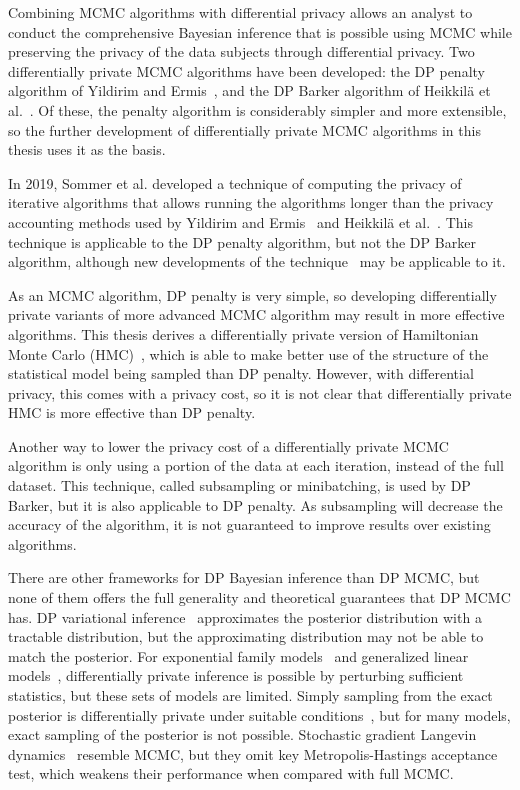 \documentclass[english,twoside,openright]{HYgraduMLDS}
\begin{document}
Combining MCMC algorithms with differential privacy allows
an analyst to conduct the comprehensive Bayesian inference that is
possible using MCMC while preserving the privacy of the data subjects through
differential privacy. Two differentially private MCMC algorithms have been
developed: the DP penalty algorithm of Yildirim and Ermis~\cite{YildirimE19},
and the DP Barker algorithm of Heikkilä et al.~\cite{HeikkilaJDH19}.
Of these, the penalty algorithm is considerably simpler and more extensible,
so the further development of differentially private MCMC algorithms in this
thesis uses it as the basis.

In 2019, Sommer et al. developed a technique of computing the privacy of
iterative algorithms that allows running the algorithms longer than the
privacy accounting methods used by Yildirim and Ermis~\cite{YildirimE19} and
Heikkilä et al.~\cite{HeikkilaJDH19}. This technique is applicable to the
DP penalty algorithm, but not the DP Barker algorithm, although new developments
of the technique~\cite{KJH20} may be applicable to it.

As an MCMC algorithm, DP penalty is very simple, so developing differentially
private variants of more advanced MCMC algorithm may result in more effective
algorithms. This thesis derives a differentially private version of
Hamiltonian Monte Carlo (HMC)~\cite{neal2012mcmc, DKP87}, which is able to make
better use of the structure of the statistical model being sampled than DP penalty.
However, with differential privacy, this comes with a privacy cost, so it is
not clear that differentially private HMC is more effective than DP penalty.

Another way to lower the privacy cost of a differentially private MCMC
algorithm is only using a portion of the data at each iteration, instead of
the full dataset. This technique, called subsampling or minibatching, is used
by DP Barker, but it is also applicable to DP penalty. As subsampling will
decrease the accuracy of the algorithm, it is not guaranteed to improve results
over existing algorithms.

There are other frameworks for DP Bayesian inference than DP MCMC, but none
of them offers the full generality and theoretical guarantees that DP MCMC
has. DP variational inference~\cite{JHD17} approximates the posterior
distribution with a tractable distribution, but the approximating distribution
may not be able to match the posterior. For exponential family models~\cite{ZRD16} and
generalized linear models~\cite{KJK20},
differentially private inference is possible by perturbing sufficient statistics,
but these sets of models are limited. Simply sampling
from the exact posterior is differentially private under suitable
conditions~\cite{DNZ17}, but for many models, exact sampling of the posterior
is not possible. Stochastic gradient Langevin dynamics~\cite{WFS15} resemble
MCMC, but they omit key Metropolis-Hastings acceptance test, which weakens
their performance when compared with full MCMC.
\end{document}
